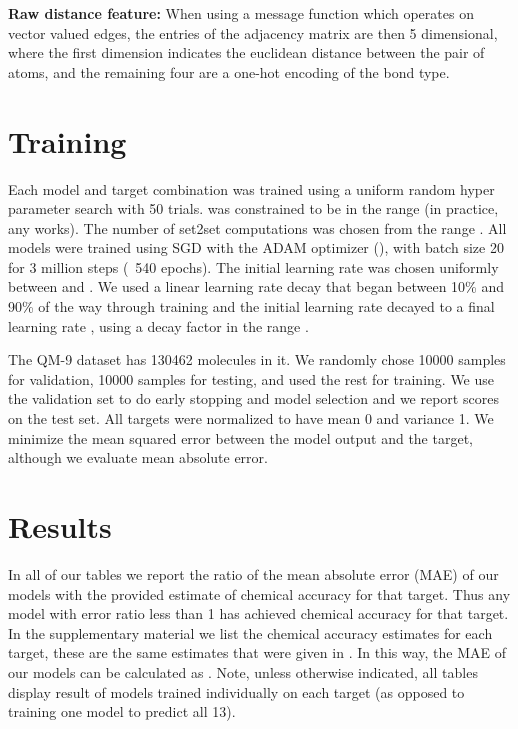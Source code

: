 \documentclass{article}
\begin{document}
\textbf{Raw distance feature:}
When using a message function which operates on vector valued edges, the entries of the adjacency matrix are then 5 dimensional, where the first dimension indicates the euclidean distance between the pair of atoms, and the remaining four are a one-hot encoding of the bond type. 

\section{Training}

Each model and target combination was trained using a uniform random hyper parameter search with 50 trials.  was constrained to be in the range  (in practice, any  works). The number of set2set computations  was chosen from the range . All models were trained using SGD with the ADAM optimizer (\citet{kingma2014adam}), with batch size 20 for 3 million steps (~540 epochs). The initial learning rate was chosen uniformly between  and . We used a linear learning rate decay that began between 10\% and 90\% of the way through training and the initial learning rate  decayed to a final learning rate , using a decay factor  in the range .

The QM-9 dataset has 130462 molecules in it. We randomly chose 10000 samples for validation, 10000 samples for testing, and used the rest for training. We use the validation set to do early stopping and model selection and we report scores on the test set. All targets were normalized to have mean 0 and variance 1. We minimize the mean squared error between the model output and the target, although we evaluate mean absolute error. 

\section{Results}

   In all of our tables we report the ratio of the mean absolute error (MAE) of our models with the provided estimate of chemical accuracy for that target. Thus any model with error ratio less than 1 has achieved chemical accuracy for that target. In the supplementary material we list the chemical accuracy estimates for each target, these are the same estimates that were given in \citet{colab}. In this way, the MAE of our models can be calculated as . Note, unless otherwise indicated, all tables display result of models trained individually on each target (as opposed to training one model to predict all 13).
\end{document}
